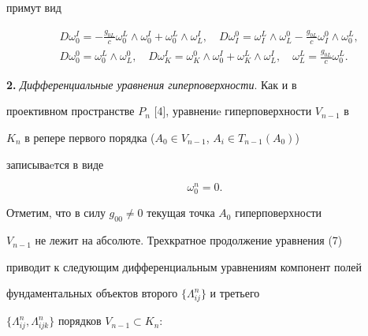 примут вид 


\begin{equation} 


\begin{split} 


& D\omega^I_0=-\frac{g_{0L}}{c}\omega^L_0\wedge \omega^I_0+ 


\omega^L_0\wedge\omega^I_L,\quad D\omega^0_I= 


\omega^L_I\wedge\omega^0_L-\frac{g_{0L}}{c}\omega^0_I 


\wedge\omega^L_0,\\ 


% 


&D\omega^0_0=\omega^L_0\wedge\omega^0_L,\quad 


D\omega^I_K=\omega^0_K\wedge\omega^I_0+ 


\omega^L_K\wedge\omega^I_L,\quad \omega^L_L= 


\frac{g_{0L}}{c}\omega^L_0. 


\end{split} 


\end{equation} 


 


{\bf 2.} {\it Дифференциальные уравнения гиперповерхности}. Как и в 


проективном пространстве $P_n$ [4], уравнениe гиперповерхности $V_{n-1}$ в 


$K_n$ в репере первого порядка ($A_0\in V_{n-1}$, $A_i\in T_{n-1}(A_0)$) 


записываeтся в виде 


\begin{equation} 


\omega^n_0=0. 


\end{equation} 


 


Отметим, что в силу $g_{00}\ne0$ текущая точка $A_0$ гиперповерхности 


$V_{n-1}$ не лежит на абсолюте. Трехкратное продолжение уравнения (7) 


приводит к следующим дифференциальным уравнениям компонент полей 


фундаментальных объектов второго $\{\Lambda^n_{ij}\}$ и третьего 


$\{\Lambda^n_{ij},\Lambda^n_{ijk}\}$ порядков $V_{n-1}\subset K_n$: 


